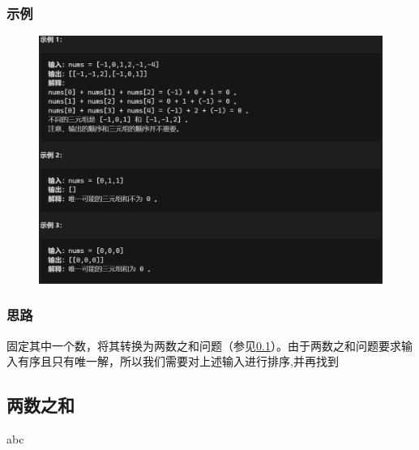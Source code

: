 \documentclass{article}
\begin{document}
\subsubsection*{示例}
\begin{figure}[H]
\includegraphics[width=0.8\linewidth]{img/15-0.png}
\end{figure}

\subsubsection*{思路}
固定其中一个数，将其转换为两数之和问题（参见\ref{sec:two-sum}）。由于两数之和问题要求输入有序且只有唯一解，所以我们需要对上述输入进行排序,并再找到

\subsection{两数之和}
\label{sec:two-sum}
abc
\end{document}
